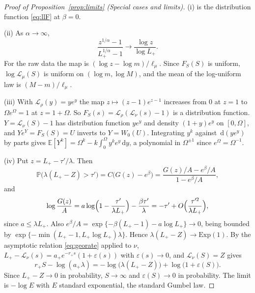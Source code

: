 \documentclass[sn-mathphys-num]{sn-jnl}\newcommand{\SNJNL}{}
\theoremstyle{thmstyleone}
\theoremstyle{thmstyletwo}
\theoremstyle{thmstylethree}
\theoremstyle{thmstyleone}
\providecommand{\E}{\mathbb{E}}
\providecommand{\Prob}{\mathbb{P}}
\providecommand{\Leh}{\mathscr{L}}
\providecommand{\dd}{\,\mathrm{d}}
\begin{document}
\begin{appendices}
		\begin{proof}[Proof of Proposition~\ref{prop:limits} (Special cases and limits)]\leavevmode
			
			\noindent(i) is the distribution function \eqref{eq:llF} at $\beta=0$.
			
			\noindent(ii) As $\alpha\to\infty$,
			\begin{equation}\label{eq:loglimit}
				\frac{z^{1/\alpha}-1}{L_+^{1/\alpha}-1}\longrightarrow\frac{\log z}{\log L_+}.
			\end{equation}
			For the raw data the map is $(\log z-\log m)/\ell_\mu$. Since
			$F_S(S)$ is uniform, $\log\Leh_\mu(S)$ is uniform on
			$(\log m,\log M)$, and the mean of the log-uniform law is
			$(M-m)/\ell_\mu$.
			
			\noindent(iii) With $\Leh_\rho(y)=ye^{y}$ the map
			$z\mapsto(z-1)e^{z-1}$ increases from $0$ at $z=1$ to
			$\Omega e^{\Omega}=1$ at $z=1+\Omega$. So
			$F_S(s)=\Leh_\rho(\Leh_\nu(s)-1)$ is a distribution function.
			$Y=\Leh_\nu(S)-1$ has distribution function $ye^{y}$ and density
			$(1+y)e^{y}$ on $[0,\Omega]$, and $Ye^{Y}=F_S(S)=U$ inverts to
			$Y=W_0(U)$. Integrating $y^{k}$ against $\dd(ye^{y})$ by parts
			gives $\E[Y^{k}]=\Omega^{k}-k\int_0^{\Omega}y^{k}e^{y}\dd y$, a
			polynomial in $\Omega^{\pm1}$ since $e^{\Omega}=\Omega^{-1}$.
			
			\noindent(iv) Put
			$z=L_+-\tau'/\lambda$. Then
			\begin{equation}\label{eq:gumbelstep}
				\Prob\bigl(\lambda(L_+-Z)>\tau'\bigr)=C\bigl(G(z)-e^{\beta}\bigr)
				=\frac{G(z)/A-e^{\beta}/A}{1-e^{\beta}/A},
			\end{equation}
			and
			\begin{equation}\label{eq:gumbellog}
				\log\frac{G(z)}{A}=a\log\Bigl(1-\frac{\tau'}{\lambda L_+}\Bigr)-\frac{\beta\tau'}{\lambda}
				=-\tau'+O\Bigl(\frac{\tau'^{2}}{\lambda L_+}\Bigr),
			\end{equation}
			since $a\le\lambda L_+$. Also
			$e^{\beta}/A=\exp\{-\beta(L_+-1)-a\log L_+\}\to0$, being bounded by
			$\exp\{-\min(L_+-1,L_+\log L_+)\lambda\}$. Hence
			$\lambda(L_+-Z)\to\mathrm{Exp}(1)$. By the asymptotic relation \eqref{eq:georate}
			applied to $\nu$, $L_+-\Leh_\nu(s)=a_+e^{-r_+s}(1+\varepsilon(s))$ with
			$\varepsilon(s)\to0$, and $\Leh_\nu(S)=Z$ gives
			\begin{equation}\label{eq:gumbelidentity}
				r_+S-\log(a_+\lambda)=-\log\bigl(\lambda(L_+-Z)\bigr)+\log\bigl(1+\varepsilon(S)\bigr).
			\end{equation}
			Since $L_+-Z\to0$ in probability, $S\to\infty$ and
			$\varepsilon(S)\to0$ in probability. The limit is $-\log E$ with
			$E$ standard exponential, the standard Gumbel law.
			

\end{proof}
\end{appendices}
\end{document}
